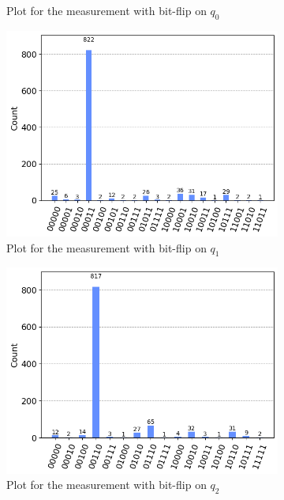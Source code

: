 \documentclass[11pt]{article}
\begin{document}
\begin{figure}[h!]
\begin{subfigure}{0.5\linewidth}
        \caption{Plot for the measurement with bit-flip on $q_0$}
    \end{subfigure}
    \begin{subfigure}{0.5\linewidth}
        \includegraphics[width=\linewidth]{outputs/measure_5_1.png}
        \caption{Plot for the measurement with bit-flip on $q_1$}
    \end{subfigure}
    \begin{subfigure}{0.5\linewidth}
        \includegraphics[width=\linewidth]{outputs/measure_5_2.png}
        \caption{Plot for the measurement with bit-flip on $q_2$}
    \end{subfigure}
    \begin{subfigure}{0.5\linewidth}

\end{subfigure}
\end{figure}
\end{document}
